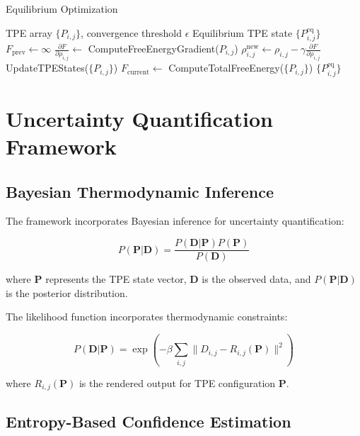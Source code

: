 \documentclass[12pt,a4paper]{article}
\begin{document}
\begin{algorithm}
\caption{Equilibrium Optimization}
\begin{algorithmic}[1]
\REQUIRE TPE array $\{P_{i,j}\}$, convergence threshold $\epsilon$
\ENSURE Equilibrium TPE state $\{P_{i,j}^{\text{eq}}\}$
\STATE $F_{\text{prev}} \leftarrow \infty$
\REPEAT
        \STATE $\frac{\partial F}{\partial \rho_{i,j}} \leftarrow$ ComputeFreeEnergyGradient($P_{i,j}$)
        \STATE $\rho_{i,j}^{\text{new}} \leftarrow \rho_{i,j} - \gamma \frac{\partial F}{\partial \rho_{i,j}}$
    \ENDFOR
    \STATE UpdateTPEStates($\{P_{i,j}\}$)
    \STATE $F_{\text{current}} \leftarrow$ ComputeTotalFreeEnergy($\{P_{i,j}\}$)
\RETURN $\{P_{i,j}^{\text{eq}}\}$
\end{algorithmic}
\end{algorithm}

\section{Uncertainty Quantification Framework}

\subsection{Bayesian Thermodynamic Inference}

The framework incorporates Bayesian inference for uncertainty quantification:

\begin{equation}
P(\mathbf{P}|\mathbf{D}) = \frac{P(\mathbf{D}|\mathbf{P})P(\mathbf{P})}{P(\mathbf{D})}
\end{equation}

where $\mathbf{P}$ represents the TPE state vector, $\mathbf{D}$ is the observed data, and $P(\mathbf{P}|\mathbf{D})$ is the posterior distribution.

The likelihood function incorporates thermodynamic constraints:

\begin{equation}
P(\mathbf{D}|\mathbf{P}) = \exp\left(-\beta \sum_{i,j} \|D_{i,j} - R_{i,j}(\mathbf{P})\|^2\right)
\end{equation}

where $R_{i,j}(\mathbf{P})$ is the rendered output for TPE configuration $\mathbf{P}$.

\subsection{Entropy-Based Confidence Estimation}
\end{document}
